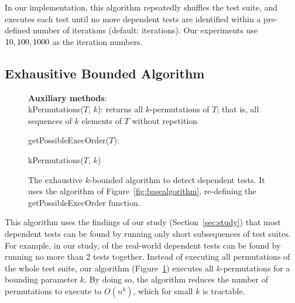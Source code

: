 In our implementation, this algorithm repeatedly
shuffles the test suite, and executes each test until
no more dependent tests are identified within a
pre-defined number of iterations (default: \smalltrialnum iterations).
Our experiments use $10,
100, 1000$ as the iteration numbers.



\subsection{Exhausitive Bounded Algorithm}
\label{sec:basic}

\begin{figure}[t]
\textbf{Auxiliary methods}:\\
kPermutations($T$, $k$): returns all $k$-permutations of $T$; that is, all
sequences of $k$ elements of $T$ without repetition

\medskip

getPossibleExecOrder($T$):\\
\vspace{-5mm}
\begin{algorithmic}[1]
\RETURN kPermutations($T$, $k$)
\end{algorithmic}

\vspace{-3mm}
\caption {The exhaustive $k$-bounded algorithm to detect dependent tests.
It uses the algorithm of Figure~\ref{fig:basealgorithm}, re-defining the
getPossibleExecOrder function.
} 
\label{fig:exhaustivealgorithm}
\end{figure}



This algorithm uses the findings of our study
(Section~\ref{sec:study})
that most dependent tests can be found by running only short
subsequences of test suites. For example,
in our study, \pertange of the real-world dependent tests
can be found by running no more than 2 tests together.
Instead of executing all permutations of the
whole test suite, our algorithm (Figure~\ref{fig:exhaustivealgorithm})
executes all $k$-permutations for a bounding
parameter $k$.
By doing so, the algorithm reduces
the number of permutations to execute
to $O(n^k)$, which for small $k$ is tractable. 


